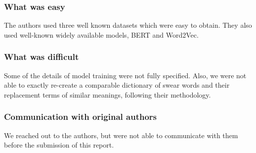\subsubsection*{What was easy}
The authors used three well known datasets which were easy to obtain. They also used well-known widely available models, BERT and Word2Vec.


\subsubsection*{What was difficult}
Some of the details of model training were not fully specified. Also, we were not able to exactly re-create a comparable dictionary of swear words and their replacement terms of similar meanings, following their methodology.


\subsubsection*{Communication with original authors}
We reached out to the authors, but were not able to communicate with them before the submission of this report. 